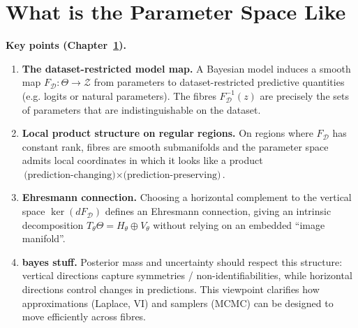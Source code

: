\chapter{What is the Parameter Space Like}
\label{chap:setting}

\begin{keypointsbox}
\noindent
\textbf{Key points (Chapter~\ref{chap:setting}).}
\begin{enumerate}\setlength{\itemsep}{2pt}
  \item \textbf{The dataset-restricted model map.}
  A Bayesian model induces a smooth map \(F_{\mathcal D}:\Theta \to \mathcal Z\) from parameters
  to dataset-restricted predictive quantities (e.g. logits or natural parameters). The fibres
  \(F_{\mathcal D}^{-1}(z)\) are precisely the sets of parameters that are indistinguishable on the dataset.

  \item \textbf{Local product structure on regular regions.}
  On regions where \(F_{\mathcal D}\) has constant rank, fibres are smooth submanifolds and the parameter
  space admits local coordinates in which it looks like a product
  \(\text{(prediction-changing)} \times \text{(prediction-preserving)}\).

  \item \textbf{ Ehresmann connection.}
  Choosing a horizontal complement to the vertical space \(\ker(dF_{\mathcal D})\) defines an Ehresmann
  connection, giving an intrinsic decomposition \(T_\theta\Theta = H_\theta \oplus V_\theta\) without relying
  on an embedded “image manifold”.

  \item \textbf{bayes stuff.}
  Posterior mass and uncertainty should respect this structure: vertical directions capture symmetries /
  non-identifiabilities, while horizontal directions control changes in predictions. This viewpoint clarifies
  how approximations (Laplace, VI) and samplers (MCMC) can be designed to move efficiently across fibres.
\end{enumerate}
\end{keypointsbox}

